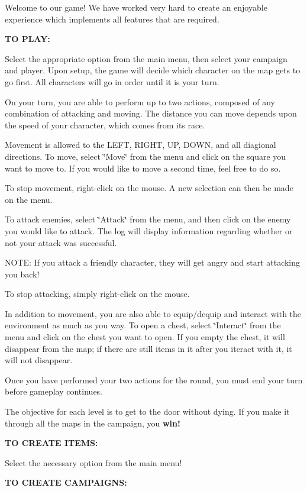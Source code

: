 Welcome to our game! We have worked very hard to create an enjoyable experience which implements all features that are required. 

{\bfseries TO P\+L\+AY\+:} 

Select the appropriate option from the main menu, then select your campaign and player. Upon setup, the game will decide which character on the map gets to go first. All characters will go in order until it is your turn. 

On your turn, you are able to perform up to two actions, composed of any combination of attacking and moving. The distance you can move depends upon the speed of your character, which comes from its race. 

Movement is allowed to the L\+E\+FT, R\+I\+G\+HT, UP, D\+O\+WN, and all diagional directions. To move, select \char`\"{}\+Move\char`\"{} from the menu and click on the square you want to move to. If you would like to move a second time, feel free to do so. 

To stop movement, right-\/click on the mouse. A new selection can then be made on the menu. 

To attack enemies, select \char`\"{}\+Attack\char`\"{} from the menu, and then click on the enemy you would like to attack. The log will display information regarding whether or not your attack was successful. 

N\+O\+TE\+: If you attack a friendly character, they will get angry and start attacking you back! 

To stop attacking, simply right-\/click on the mouse. 

In addition to movement, you are also able to equip/dequip and interact with the environment as much as you way. To open a chest, select \char`\"{}\+Interact\char`\"{} from the menu and click on the chest you want to open. If you empty the chest, it will disappear from the map; if there are still items in it after you iteract with it, it will not disappear. 

Once you have performed your two actions for the round, you must end your turn before gameplay continues. 

The objective for each level is to get to the door without dying. If you make it through all the maps in the campaign, you {\bfseries win!} 

{\bfseries TO C\+R\+E\+A\+TE I\+T\+E\+MS\+:} 

Select the necessary option from the main menu! 

{\bfseries TO C\+R\+E\+A\+TE C\+A\+M\+P\+A\+I\+G\+NS\+:} 

